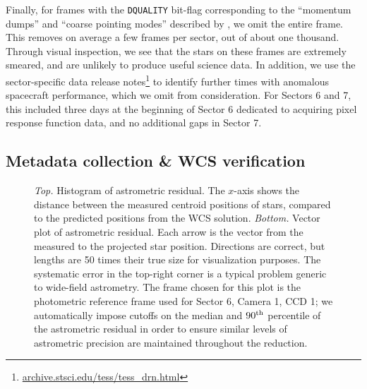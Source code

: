 \documentclass[12pt,twocolumn,tighten]{aastex62}
\begin{document}
Finally, for frames with the \texttt{DQUALITY} bit-flag corresponding
to the ``momentum dumps'' and ``coarse pointing modes'' described by
\citet{vanderspek_2018}, we omit the entire frame.  This removes on
average a few frames per sector, out of about one thousand. Through
visual inspection, we see that the stars on these frames are extremely
smeared, and are unlikely to produce useful science data.  In
addition, we use the sector-specific data release notes\footnote{\url{
  archive.stsci.edu/tess/tess_drn.html}} to identify further times
with anomalous spacecraft performance, which we omit from
consideration.  For Sectors 6 and 7, this included three days at the
beginning of Sector 6 dedicated to acquiring pixel response function
data, and no additional gaps in Sector 7.

\subsection{Metadata collection \& WCS verification}
\label{subsec:metadatacollection}

\begin{figure}[!t]
	\vspace{-0.8cm}
	\vspace{-0.8cm}
    \caption{
		{\it Top.} Histogram of astrometric residual. The $x$-axis shows 
		the distance between the measured centroid positions of stars, 
		compared to the predicted positions from the WCS solution.
		{\it Bottom.} Vector plot of astrometric residual. Each arrow is 
		the vector from the measured to the projected star position. 
		Directions are correct, but lengths are 50 times their true size for 
		visualization purposes.
    The systematic error in the top-right corner is a typical
    problem generic to wide-field astrometry.
    The frame chosen for this plot is the photometric reference frame used 
    for Sector 6, Camera 1, CCD 1; we automatically 
    impose cutoffs on the median and $90^{\rm th}$ percentile of the 
    astrometric residual in order to ensure similar levels of astrometric 
    precision are maintained throughout the reduction.
	}
	\label{fig:astromresid}
\end{figure}
\end{document}
